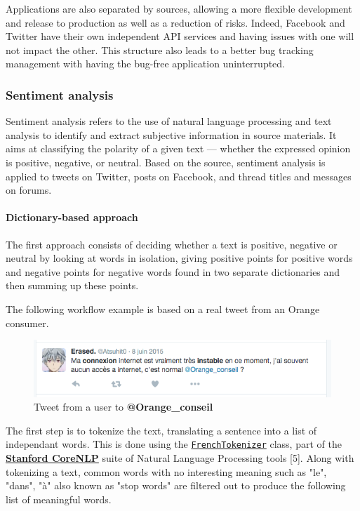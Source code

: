 \documentclass[11pt]{article}
\begin{document}
Applications are also separated by sources, allowing a more flexible development and release to production as well as a reduction of risks. Indeed, \textsf{Facebook} and \textsf{Twitter} have their own independent API services and having issues with one will not impact the other. This structure also leads to a better bug tracking management with having the bug-free application uninterrupted.

\subsubsection{Sentiment analysis}

Sentiment analysis refers to the use of natural language processing and text analysis to identify and extract subjective information in source materials. It aims at classifying the polarity of a given text — whether the expressed opinion is positive, negative, or neutral. 
Based on the source, sentiment analysis is applied to tweets on \textsf{Twitter}, posts on \textsf{Facebook}, and thread titles and messages on forums.

\paragraph{Dictionary-based approach}

The first approach consists of deciding whether a text is positive, negative or neutral by looking at words in isolation, giving positive points for positive words and negative points for negative words found in two separate dictionaries and then summing up these points.

The following workflow example is based on a real tweet from an \textsf{Orange} consumer.

\begin{figure}[h!]
    \centering
    \includegraphics[scale=0.6]{img/tweet1.png}
    \caption{Tweet from a user to \textbf{@Orange\_conseil}}
    \label{tweet1}
\end{figure}

The first step is to tokenize the text, translating a sentence into a list of independant words. This is done using the  \href{https://github.com/stanfordnlp/CoreNLP/blob/master/src/edu/stanford/nlp/international/french/process/FrenchTokenizer.java}{\texttt{FrenchTokenizer}} class, part of the \href{https://stanfordnlp.github.io/CoreNLP}{\textsf{\textbf{Stanford CoreNLP}}} suite of Natural Language Processing tools [5]. Along with tokenizing a text, common words with no interesting meaning such as "le", "dans", "à" also known as "stop words" are filtered out to produce the following list of meaningful words.
\end{document}
